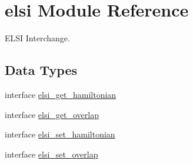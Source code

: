 \hypertarget{namespaceelsi}{}\section{elsi Module Reference}
\label{namespaceelsi}


E\+L\+S\+I Interchange.  


\subsection*{Data Types}
\begin{DoxyCompactItemize}
\item 
interface \hyperlink{interfaceelsi_1_1elsi__get__hamiltonian}{elsi\+\_\+get\+\_\+hamiltonian}
\item 
interface \hyperlink{interfaceelsi_1_1elsi__get__overlap}{elsi\+\_\+get\+\_\+overlap}
\item 
interface \hyperlink{interfaceelsi_1_1elsi__set__hamiltonian}{elsi\+\_\+set\+\_\+hamiltonian}
\item 
interface \hyperlink{interfaceelsi_1_1elsi__set__overlap}{elsi\+\_\+set\+\_\+overlap}
\end{DoxyCompactItemize}
